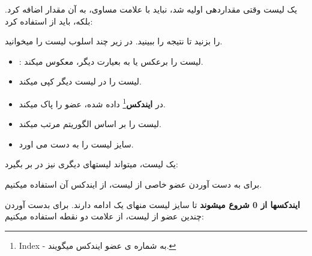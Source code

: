 \documentclass[14pt,a4paper]{memoir}
\begin{document}
	 		یک لیست وقتی مقداردهی اولیه شد، نباید با علامت مساوی، به آن مقدار اضافه کرد. بلکه، باید از  استفاده کرد:
	 	\begin{latin}
	 			
	 	\end{latin}
 		
  را بزنید تا نتیجه را ببینید.
 		در زیر چند اسلوب لیست را میخوانید.
 		\begin{itemize}
 			\item {}: لیست را برعکس یا به بعیارت دیگر، معکوس میکند.
 			\item  {} لیست را در لیست دیگر کپی میکند.
 			\item  {} در \textbf{ایندکس}\footnote{Index - به شماره ی عضو ایندکس میگویند.} داده شده، عضو را پاک میکند.
 			\item {} لیست را بر اساس الگوریتم \textbf{} مرتب میکند.
 			\item  {} سایز لیست را به دست می اورد.
 		\end{itemize}
 		
	 		
	 یک لیست، میتواند لیستهای دیگری نیز در بر بگیرد:
	 
	 
	 	\begin{latin}
	 	
	 \end{latin}
 
 برای به دست آوردن عضو خاصی از لیست، از ایندکس آن استفاده میکنیم.
 
 	 	\begin{latin}
 	
 \end{latin}
\textbf{ایندکسها از 0 شروع میشوند} تا سایز لیست منهای یک ادامه دارند. برای بدست آوردن چندین عضو از لیست، از علامت دو نقطه استفاده میکنیم:
\end{document}
